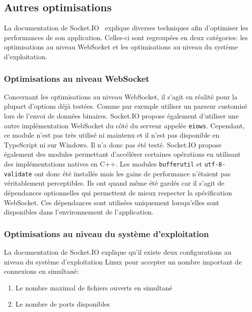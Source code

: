 \subsection{Autres optimisations}

La documentation de Socket.IO~\cite{socket-io-performance-tuning} explique diverses techniques afin d'optimiser les performances de son application. Celles-ci sont regroupées en deux catégories: les optimisations au niveau WebSocket et les optimisations au niveau du système d'exploitation.

\subsubsection{Optimisations au niveau WebSocket}

Concernant les optimisations au niveau WebSocket, il s'agit en réalité pour la plupart d'options déjà testées. Comme par exemple utiliser un parseur customisé lors de l'envoi de données binaires. Socket.IO propose également d'utiliser une autre implémentation WebSocket du côté du serveur appelée \texttt{eiows}. Cependant, ce module n'est pas très utilisé ni maintenu et il n'est pas disponible en TypeScript ni sur Windows. Il n'a donc pas été testé. Socket.IO propose également des modules permettant d'accélérer certaines opérations en utilisant des implémentations natives en C++. Les modules \texttt{bufferutil} et \texttt{utf-8-validate} ont donc été installés mais les gains de performance n'étaient pas véritablement perceptibles. Ils ont quand même été gardés car il s'agit de dépendances optionnelles qui permettent de mieux respecter la spécification WebSocket. Ces dépendances sont utilisées uniquement lorsqu'elles sont disponibles dans l'environnement de l'application.

\subsubsection{Optimisations au niveau du système d'exploitation}

La documentation de Socket.IO explique qu'il existe deux configurations au niveau du système d'exploitation Linux pour accepter un nombre important de connexions en simultané:

\begin{enumerate}
  \item Le nombre maximal de fichiers ouverts en simultané
  \item Le nombre de ports disponibles
\end{enumerate}

